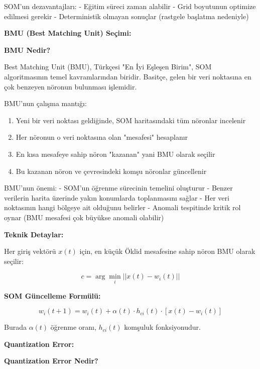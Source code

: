 SOM'un dezavantajları:
- Eğitim süreci zaman alabilir
- Grid boyutunun optimize edilmesi gerekir
- Deterministik olmayan sonuçlar (rastgele başlatma nedeniyle)

\newpage

\textbf{BMU (Best Matching Unit) Seçimi:}

\textbf{BMU Nedir?}

Best Matching Unit (BMU), Türkçesi "En İyi Eşleşen Birim", SOM algoritmasının temel kavramlarından biridir. Basitçe, gelen bir veri noktasına en çok benzeyen nöronun bulunması işlemidir.

BMU'nun çalışma mantığı:
\begin{enumerate}
    \item Yeni bir veri noktası geldiğinde, SOM haritasındaki tüm nöronlar incelenir
    \item Her nöronun o veri noktasına olan "mesafesi" hesaplanır
    \item En kısa mesafeye sahip nöron "kazanan" yani BMU olarak seçilir
    \item Bu kazanan nöron ve çevresindeki komşu nöronlar güncellenir
\end{enumerate}

BMU'nun önemi:
- SOM'un öğrenme sürecinin temelini oluşturur
- Benzer verilerin harita üzerinde yakın konumlarda toplanmasını sağlar
- Her veri noktasının hangi bölgeye ait olduğunu belirler
- Anomali tespitinde kritik rol oynar (BMU mesafesi çok büyükse anomali olabilir)

\textbf{Teknik Detaylar:}

Her giriş vektörü $x(t)$ için, en küçük Öklid mesafesine sahip nöron BMU olarak seçilir:

\begin{equation}
c = \arg\min_i ||x(t) - w_i(t)||
\label{eq:bmu_selection}
\end{equation}

\textbf{SOM Güncelleme Formülü:}

\begin{equation}
w_i(t+1) = w_i(t) + \alpha(t) \cdot h_{ci}(t) \cdot [x(t) - w_i(t)]
\label{eq:som_update}
\end{equation}

Burada $\alpha(t)$ öğrenme oranı, $h_{ci}(t)$ komşuluk fonksiyonudur.

\newpage

\textbf{Quantization Error:}

\textbf{Quantization Error Nedir?}


